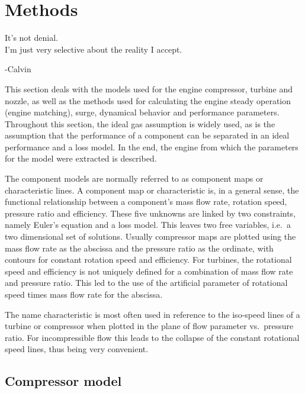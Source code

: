 \chapter{Methods}
\label{sec:methods}
\epigraph{It's not denial. \\ I'm just very selective about the reality I accept.}{-Calvin}

This section deals with the models used for the engine compressor, turbine and nozzle, 
as well as the methods used for calculating the engine steady operation (engine matching), 
surge, dynamical behavior and performance parameters. 
Throughout this section, the ideal gas assumption is widely used, 
as is the assumption that the performance of a component can be separated in an ideal performance and a loss model. 
In the end, the engine from which the parameters for the model were extracted is described.

The component models are normally referred to as component maps or characteristic lines. 
A component map or characteristic is, in a general sense, the functional relationship between a component's
mass flow rate, rotation speed, pressure ratio and efficiency. 
These five unknowns are linked by two constraints, namely Euler's equation and a loss model. 
This leaves two free variables, i.e.\ a two dimensional set of solutions.
Usually compressor maps are plotted using the mass flow rate as the abscissa and  the pressure ratio as the ordinate, with contours for constant rotation speed and efficiency. 
For turbines, the rotational speed and efficiency is not uniquely defined for a combination of mass flow rate and pressure ratio. This led to the use of the artificial parameter of rotational speed times mass flow rate for the abscissa.

The name characteristic is most often used in reference to the iso-speed lines of a turbine or compressor when plotted in the plane of flow parameter vs.\ pressure ratio.
For incompressible flow this leads to the collapse of the constant rotational speed lines, thus being very convenient.

\section{Compressor model}



